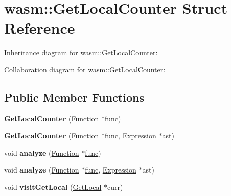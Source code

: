 \hypertarget{structwasm_1_1_get_local_counter}{}\section{wasm\+:\+:Get\+Local\+Counter Struct Reference}
\label{structwasm_1_1_get_local_counter}


Inheritance diagram for wasm\+:\+:Get\+Local\+Counter\+:


Collaboration diagram for wasm\+:\+:Get\+Local\+Counter\+:
\subsection*{Public Member Functions}
\begin{DoxyCompactItemize}
\item 
\mbox{\label{structwasm_1_1_get_local_counter_a532459b46dade8d8e2287727f023a9e6}} 
{\bfseries Get\+Local\+Counter} (\mbox{\hyperlink{classwasm_1_1_function}{Function}} $\ast$\mbox{\hyperlink{structfunc}{func}})
\item 
\mbox{\label{structwasm_1_1_get_local_counter_aba2e018e5168a27d3a881c3e75cf4e1d}} 
{\bfseries Get\+Local\+Counter} (\mbox{\hyperlink{classwasm_1_1_function}{Function}} $\ast$\mbox{\hyperlink{structfunc}{func}}, \mbox{\hyperlink{classwasm_1_1_expression}{Expression}} $\ast$ast)
\item 
\mbox{\label{structwasm_1_1_get_local_counter_aab00d2638c7cd6dee011863192cdc32c}} 
void {\bfseries analyze} (\mbox{\hyperlink{classwasm_1_1_function}{Function}} $\ast$\mbox{\hyperlink{structfunc}{func}})
\item 
\mbox{\label{structwasm_1_1_get_local_counter_aa9007fdcc684c8166eb68262e18ddc69}} 
void {\bfseries analyze} (\mbox{\hyperlink{classwasm_1_1_function}{Function}} $\ast$\mbox{\hyperlink{structfunc}{func}}, \mbox{\hyperlink{classwasm_1_1_expression}{Expression}} $\ast$ast)
\item 
\mbox{\label{structwasm_1_1_get_local_counter_a321461c1c0e1816c0343ca1c1b357127}} 
void {\bfseries visit\+Get\+Local} (\mbox{\hyperlink{classwasm_1_1_get_local}{Get\+Local}} $\ast$curr)
\end{DoxyCompactItemize}
